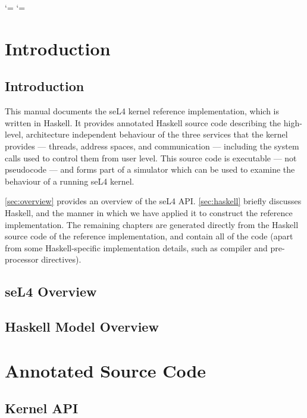 \documentclass[a4paper,11pt,twoside]{report}
\begin{document}
  \cleardoublepage
  \setcounter{page}{1}

\catcode`\<=\active
\catcode`\>=\active


\part{Introduction}

\chapter{Introduction}

This manual documents the seL4 kernel reference implementation, which
is written in Haskell. It provides annotated Haskell source code
describing the high-level, architecture independent behaviour of the
three services that the kernel provides --- threads, address spaces,
and communication --- including the system calls used to control them
from user level. This source code is executable --- not pseudocode ---
and forms part of a simulator which can be used to examine the
behaviour of a running seL4 kernel.

\autoref{sec:overview} provides an overview of the seL4 API. \autoref{sec:haskell} briefly discusses Haskell, and the manner in which we have applied it to construct the reference implementation. The remaining chapters are generated directly from the Haskell source code of the reference implementation, and contain all of the code (apart from some Haskell-specific implementation details, such as compiler and pre-processor directives).

\chapter{seL4 Overview}\label{sec:overview}


\chapter{Haskell Model Overview}\label{sec:haskell}


\part{Annotated Source Code}

\chapter{Kernel API}\label{sec:api}
\end{document}
